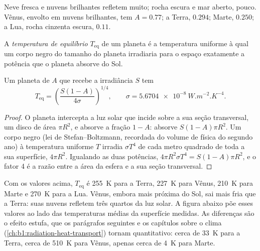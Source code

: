 Neve fresca e nuvens brilhantes refletem muito; rocha escura e mar aberto, pouco. Vênus, envolto em nuvens brilhantes, tem $A = 0.77$; a Terra, $0.294$; Marte, $0.250$; a Lua, rocha cinzenta escura, $0.11$.

\begin{definition}\label{def:b1:comparative-planetology:equilibrium-temperature}
A \emph{temperatura de equilíbrio} $T_\mathrm{eq}$ de um planeta é a temperatura uniforme à qual um corpo negro do tamanho do planeta irradiaria para o espaço exatamente a potência que o planeta absorve do Sol.
\end{definition}

\begin{proposition}\label{prop:b1:comparative-planetology:teq}
Um planeta de  $A$ que recebe a irradiância $S$ tem
\[
  T_\mathrm{eq} = \left(\frac{S(1 - A)}{4\sigma}\right)^{1/4},
  \qquad \sigma = \qty{5.6704e-8}{W.m^{-2}.K^{-4}} .
\]
\end{proposition}

\begin{proof}
O planeta intercepta a luz solar que incide sobre a sua seção transversal, um disco de área $\pi R^2$, e absorve a fração $1 - A$: absorve $S(1 - A)\pi
R^2$. Um corpo negro (lei de Stefan--Boltzmann, recordada do volume de física do segundo ano) à temperatura uniforme $T$ irradia $\sigma T^4$ de cada metro quadrado de toda a sua superfície, $4\pi R^2$. Igualando as duas potências,
$4\pi R^2\sigma T^4 = S(1 - A)\pi R^2$, e o fator 4 é a razão entre a área da esfera e a sua seção transversal.
\end{proof}

Com os valores acima, $T_\mathrm{eq}$ é \qty{255}{K} para a Terra, \qty{227}{K} para Vênus, \qty{210}{K} para Marte e \qty{270}{K} para a Lua. Vênus, embora mais próxima do Sol, sai mais fria que a Terra: suas nuvens refletem três quartos da luz solar. A figura abaixo põe esses valores ao lado das temperaturas médias da superfície medidas. As diferenças são o efeito estufa, que os parágrafos seguintes e os capítulos sobre o clima (\cref{ch:b1:radiation-heat-transport}) tornam quantitativo: cerca de \qty{33}{K} para a Terra, cerca de \qty{510}{K} para Vênus, apenas cerca de \qty{4}{K} para Marte.


